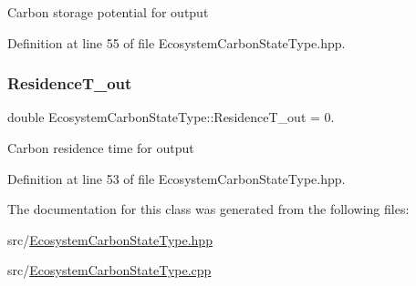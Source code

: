 Carbon storage potential for output 

Definition at line 55 of file Ecosystem\+Carbon\+State\+Type.\+hpp.

\mbox{\label{class_ecosystem_carbon_state_type_aa98b5ed995c5f549c37d4131487d5707}} 
\subsubsection{\texorpdfstring{Residence\+T\+\_\+out}{ResidenceT\_out}}
{\footnotesize\ttfamily double Ecosystem\+Carbon\+State\+Type\+::\+Residence\+T\+\_\+out = 0.}

Carbon residence time for output 

Definition at line 53 of file Ecosystem\+Carbon\+State\+Type.\+hpp.



The documentation for this class was generated from the following files\+:\begin{DoxyCompactItemize}
\item 
src/\mbox{\hyperlink{_ecosystem_carbon_state_type_8hpp}{Ecosystem\+Carbon\+State\+Type.\+hpp}}\item 
src/\mbox{\hyperlink{_ecosystem_carbon_state_type_8cpp}{Ecosystem\+Carbon\+State\+Type.\+cpp}}\end{DoxyCompactItemize}
